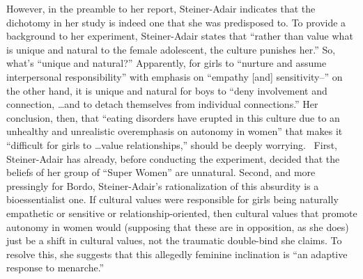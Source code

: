 \documentclass[11pt]{article}
\begin{document}
    However, in the preamble to her report, Steiner-Adair indicates that the dichotomy in her study is indeed one that she was predisposed to. To provide a background to her experiment, Steiner-Adair states that ``rather than value what is unique and natural to the female adolescent, the culture punishes her.'' So, what's ``unique and natural?'' Apparently, for girls to ``nurture and assume interpersonal responsibility'' with emphasis on ``empathy [and] sensitivity--'' on the other hand, it is unique and natural for boys to ``deny involvement and connection, \dots and to detach themselves from individual connections.'' Her conclusion, then, that ``eating disorders have erupted in this culture due to an unhealthy and unrealistic overemphasis on autonomy in women'' that makes it ``difficult for girls to \dots value relationships,'' should be deeply worrying.~\autocite[98-102]{SteinerAdair86} First, Steiner-Adair has already, before conducting the experiment, decided that the beliefs of her group of ``Super Women'' are unnatural. Second, and more pressingly for Bordo, Steiner-Adair's rationalization of this absurdity is a bioessentialist one. If cultural values were responsible for girls being naturally empathetic or sensitive or relationship-oriented, then cultural values that promote autonomy in women would (supposing that these are in opposition, as she does) just be a shift in cultural values, not the traumatic double-bind she claims. To resolve this, she suggests that this allegedly feminine inclination is ``an adaptive response to menarche.''~\autocite[{101. Bordo would appear to disagree with my characterization. For her, these ``superwomen'' are ``not permitted to abandon their `femininity''' because of the demands placed upon them as ``wives and mothers'' in addition to the masculine demands of the workplace. I do think this is a valuable idea, although the cultural expectation that women are ``wives and mothers'' may not apply in the same way today. However, the essentialist language of Steiner-Adair's work, especially her claim that contemporary culture culture neglects the supposedly-immutable developmental needs of adolescent girls, leads me to believe that Steiner-Adair is not drawing this conclusion. Further, she states her result to be an ``association between thinness and autonomy,'' i.e. between thinness and the masculine ideal, not the realization of its impossibility as Bordo says.}]{SteinerAdair86} 
\end{document}
